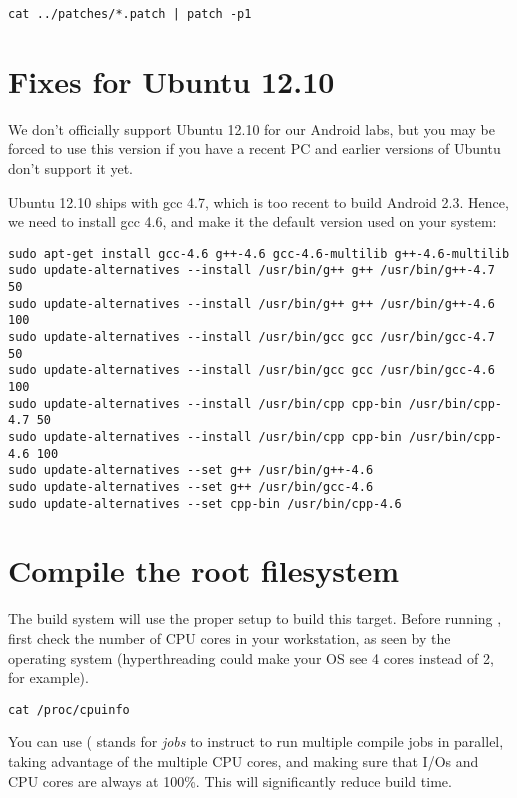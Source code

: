 \begin{verbatim}
cat ../patches/*.patch | patch -p1
\end{verbatim}

\section{Fixes for Ubuntu 12.10}

We don't officially support Ubuntu 12.10 for our Android labs, but you
may be forced to use this version if you have a recent PC and earlier
versions of Ubuntu don't support it yet.

Ubuntu 12.10 ships with gcc 4.7, which is too recent to build Android
2.3. Hence, we need to install gcc 4.6, and make it the default version
used on your system:

\begin{verbatim}
sudo apt-get install gcc-4.6 g++-4.6 gcc-4.6-multilib g++-4.6-multilib
sudo update-alternatives --install /usr/bin/g++ g++ /usr/bin/g++-4.7 50
sudo update-alternatives --install /usr/bin/g++ g++ /usr/bin/g++-4.6 100
sudo update-alternatives --install /usr/bin/gcc gcc /usr/bin/gcc-4.7 50
sudo update-alternatives --install /usr/bin/gcc gcc /usr/bin/gcc-4.6 100
sudo update-alternatives --install /usr/bin/cpp cpp-bin /usr/bin/cpp-4.7 50
sudo update-alternatives --install /usr/bin/cpp cpp-bin /usr/bin/cpp-4.6 100
sudo update-alternatives --set g++ /usr/bin/g++-4.6
sudo update-alternatives --set g++ /usr/bin/gcc-4.6
sudo update-alternatives --set cpp-bin /usr/bin/cpp-4.6
\end{verbatim}

\section{Compile the root filesystem}

The build system will use the proper setup to build this
target. Before running , first check the number of CPU
cores in your workstation, as seen by the operating system
(hyperthreading could make your OS see 4 cores instead of 2, for
example).

\begin{verbatim}
cat /proc/cpuinfo
\end{verbatim}

You can use  ( stands for {\it jobs} to instruct
 to run multiple compile jobs in parallel, taking advantage
of the multiple CPU cores, and making sure that I/Os and CPU cores are
always at 100\%. This will significantly reduce build time.

